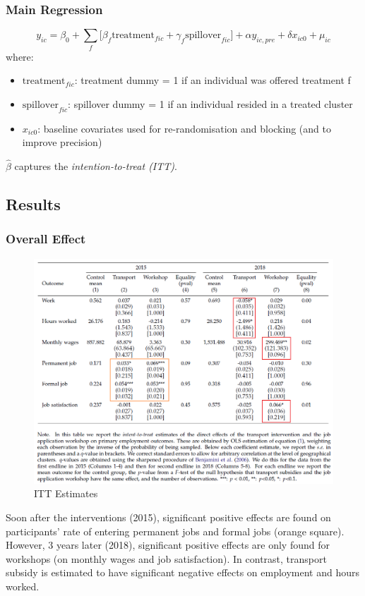         \subsubsection{Main Regression}
            \begin{equation*}
                y_{ic} = \beta_0 + \sum_{f} \big[ \beta_f \text{treatment}_{fic} + \gamma_f \text{spillover}_{fic} \big] + \alpha y_{ic, pre} + \delta x_{ic0} + \mu_{ic}
            \end{equation*}
            where:
            \begin{itemize}
                \item $\text{treatment}_{fic}$: treatment dummy = 1 if an individual was offered treatment f
                \item $\text{spillover}_{fic}$: spillover dummy = 1 if an individual resided in a treated cluster
                \item $x_{ic0}$: baseline covariates used for re-randomisation and blocking (and to improve precision)
            \end{itemize}
            $\hat{\beta}$ captures the \emph{intention-to-treat (ITT)}.
            
    \subsection{Results}
    
        \subsubsection{Overall Effect}
            \begin{figure}[H]
                \centering
                \includegraphics[width=5in]{images/ch6/Abebe result 1.png}
                \caption{ITT Estimates}
            \end{figure}
            Soon after the interventions (2015), significant positive effects are found on participants' rate of entering permanent jobs and formal jobs (orange square). However, 3 years later (2018), significant positive effects are only found for workshops (on monthly wages and job satisfaction). In contrast, transport subsidy is estimated to have significant negative effects on employment and hours worked.
            
